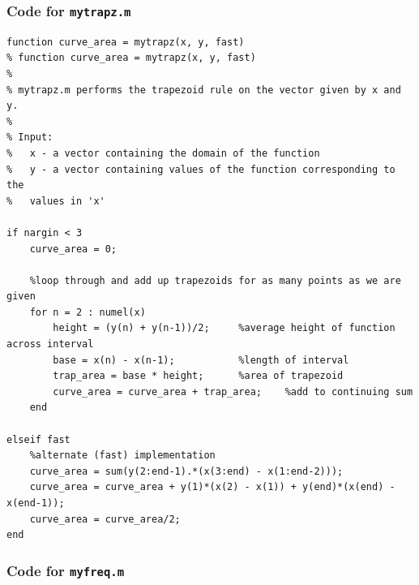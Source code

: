 \documentclass{article}
\begin{document}
\subsubsection* {Code for \tt mytrapz.m}

\begin{verbatim}
function curve_area = mytrapz(x, y, fast)
% function curve_area = mytrapz(x, y, fast)
%
% mytrapz.m performs the trapezoid rule on the vector given by x and y.
%
% Input:
%   x - a vector containing the domain of the function
%   y - a vector containing values of the function corresponding to the
%   values in 'x'

if nargin < 3
    curve_area = 0;
    
    %loop through and add up trapezoids for as many points as we are given
    for n = 2 : numel(x)
        height = (y(n) + y(n-1))/2;     %average height of function across interval
        base = x(n) - x(n-1);           %length of interval
        trap_area = base * height;      %area of trapezoid
        curve_area = curve_area + trap_area;    %add to continuing sum
    end
    
elseif fast
    %alternate (fast) implementation
    curve_area = sum(y(2:end-1).*(x(3:end) - x(1:end-2)));
    curve_area = curve_area + y(1)*(x(2) - x(1)) + y(end)*(x(end) - x(end-1));
    curve_area = curve_area/2;
end
\end{verbatim}



\subsubsection* {Code for \tt myfreq.m}
\end{document}
